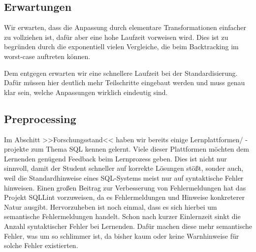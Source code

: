 \subsection{Erwartungen}

Wir erwarten, dass die Anpassung durch elementare Transformationen einfacher zu vollziehen ist, dafür aber eine hohe Laufzeit vorweisen wird. Dies ist zu begründen durch die exponentiell vielen Vergleiche, die beim Backtracking im worst-case auftreten können. 

Dem entgegen erwarten wir eine schnellere Laufzeit bei der Standardisierung. Dafür müssen hier deutlich mehr Teilschritte eingebaut werden und muss genau klar sein, welche Anpassungen wirklich eindeutig sind.


\subsection{Preprocessing}
\label{subsec:preprocessing}

Im Abschitt >>Forschungsstand<< haben wir bereits einige Lernplattformen/ -projekte zum Thema SQL kennen gelernt. Viele dieser Plattformen möchten dem Lernenden genügend Feedback beim Lernprozess geben. Dies ist nicht nur sinnvoll, damit der Student schneller auf korrekte Lösungen stößt, sonder auch, weil die Standardhinweise eines SQL-Systems meist nur auf syntaktische Fehler hinweisen. Einen großen Beitrag zur Verbesserung von Fehlermeldungen hat das Projekt SQLLint vorzuweisen, da es Fehlermeldungen und Hinweise konkreterer Natur ausgibt. Hervorzuheben ist noch einmal, dass es sich hierbei um semantische Fehlermeldungen handelt. Schon nach kurzer Einlernzeit sinkt die Anzahl syntaktischer Fehler bei Lernenden. Dafür machen diese mehr semantische Fehler, was um so schlimmer ist, da bisher kaum oder keine Warnhinweise für solche Fehler existierten. 


